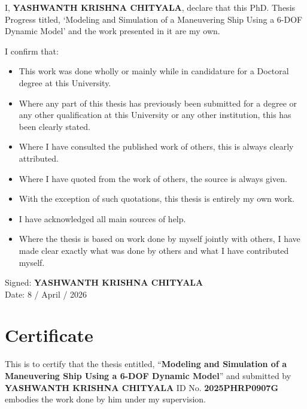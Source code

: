 \documentclass[12pt,a4paper]{report}
\begin{document}
I, \textbf{YASHWANTH KRISHNA CHITYALA}, declare that this PhD. Thesis Progress titled, ‘Modeling and Simulation of a Maneuvering Ship Using a 6-DOF Dynamic Model’ and the work presented in it are my own.

\vspace{0.5cm}
\noindent I confirm that:
\begin{itemize}
    \item This work was done wholly or mainly while in candidature for a Doctoral degree at this University.
    \item Where any part of this thesis has previously been submitted for a degree or any other qualification at this University or any other institution, this has been clearly stated.
    \item Where I have consulted the published work of others, this is always clearly attributed.
    \item Where I have quoted from the work of others, the source is always given.
    \item With the exception of such quotations, this thesis is entirely my own work.
    \item I have acknowledged all main sources of help.
    \item Where the thesis is based on work done by myself jointly with others, I have made clear exactly what was done by others and what I have contributed myself.
\end{itemize}

\vspace{1.5cm}
\noindent Signed: \textbf{YASHWANTH KRISHNA CHITYALA} \\
\noindent Date: 8 / April / 2026

\clearpage

\chapter*{Certificate}

This is to certify that the thesis entitled, “\textbf{Modeling and Simulation of a Maneuvering Ship Using a 6-DOF Dynamic Model}” and submitted by \textbf{YASHWANTH KRISHNA CHITYALA} ID No. \textbf{2025PHRP0907G} embodies the work done by him under my supervision.

\vspace{3cm}
\end{document}
